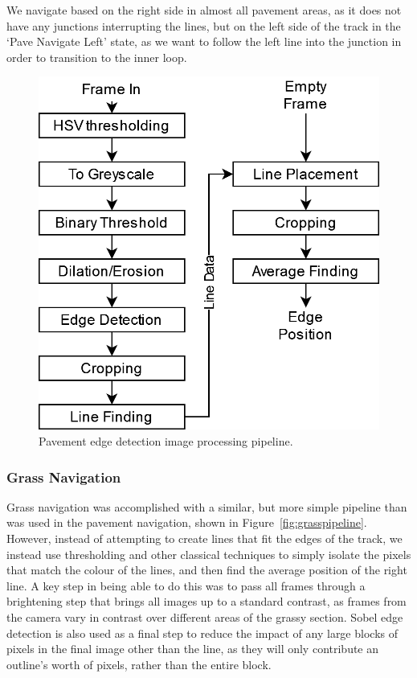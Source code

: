 \documentclass[titlepage, twocolumn]{article}
\begin{document}
            We navigate based on the right side in almost all pavement areas, as it does not have any junctions interrupting the lines, but on the left side of the track in the `Pave Navigate Left' state, as we want to follow the left line into the junction in order to transition to the inner loop. 

            \begin{figure}
                \begin{center}
                    \includegraphics[width=0.80\linewidth]{pavepipeline.png}
                \end{center}
                \caption{Pavement edge detection image processing pipeline.}
                \label{fig:pavepipeline}
            \end{figure}

        \subsubsection{Grass Navigation}

            Grass navigation was accomplished with a similar, but more simple pipeline than was used in the pavement navigation, shown in Figure~\ref{fig:grasspipeline}. However, instead of attempting to create lines that fit the edges of the track, we instead use thresholding and other classical techniques to simply isolate the pixels that match the colour of the lines, and then find the average position of the right line. A key step in being able to do this was to pass all frames through a brightening step that brings all images up to a standard contrast, as frames from the camera vary in contrast over different areas of the grassy section. Sobel edge detection is also used as a final step to reduce the impact of any large blocks of pixels in the final image other than the line, as they will only contribute an outline's worth of pixels, rather than the entire block. 
\end{document}

